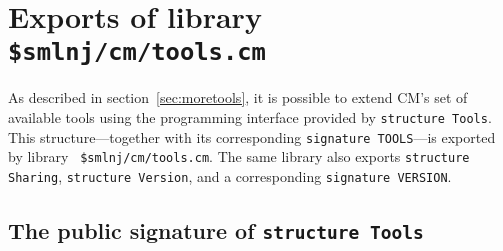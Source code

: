 
\section{Exports of library {\tt \$smlnj/cm/tools.cm}}

As described in section~\ref{sec:moretools}, it is possible to extend
CM's set of available tools using the programming interface provided
by {\tt structure Tools}.  This structure---together with its
corresponding {\tt signature TOOLS}---is exported by library {\tt
\$smlnj/cm/tools.cm}.  The same library also exports {\tt structure
Sharing}, {\tt structure Version}, and a corresponding {\tt signature
VERSION}.

\subsection{The public signature of {\tt structure Tools}}

